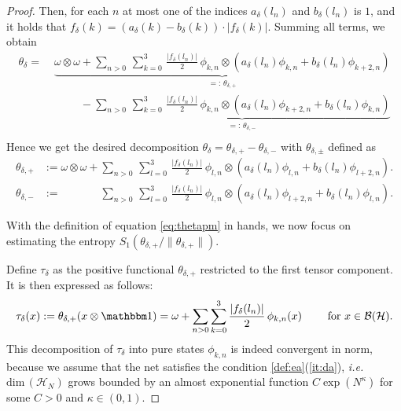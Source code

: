 \documentclass[a4paper,12pt]{article}
\theoremstyle{plain}
\theoremstyle{definition}
\theoremstyle{remark}
\def\B{{\mathcal B}}
\def\H{{\mathcal H}}
\def\dim{\mathrm{dim}\,}
\def\1{{\mathbbm 1}}
\begin{document}
\begin{proof}
Then, for each $n$ at most one of the indices $a_\delta(l_n)$ and $b_\delta(l_n)$ is $1$,
and it holds that $f_\delta(k) = (a_\delta(k) - b_\delta(k))\cdot \left|f_\delta(k)\right|$.
Summing all terms,
we obtain
\begin{align*}
  \theta_\delta =& \; \underbrace{ \omega\otimes\omega +
  \sum_{n>0}\,\sum_{k=0}^3\, \frac{| f_\delta(l_n)|}{2}\,\phi_{k,n} \otimes \left( a_\delta(l_n) \phi_{k,n} + b_{\delta}(l_n)\phi_{k+2,n} \right)}_{=: \, \theta_{\delta,+}} \\
  & \; \phantom{\omega\otimes\omega} -\underbrace{
  \sum_{n>0}\,\sum_{k=0}^3\, \frac{| f_\delta(l_n)|}{2}\, \phi_{k,n} \otimes \left( a_\delta(l_n) \phi_{k+2,n} + b_{\delta}(l_n)\phi_{k,n}
  \right)}_{=: \, \theta_{\delta,-}} \\
\end{align*}
Hence we get the desired decomposition $\theta_\delta = \theta_{\delta, +} - \theta_{\delta, -}$ with  $\theta_{\delta,\pm}$ defined as
\begin{align}\label{eq:thetapm}
  \theta_{\delta,+} &:= \omega\otimes\omega +
  \sum_{n>0}\,\sum_{l=0}^3\, \frac{|f_\delta(l_n)|}{2}\,\phi_{l,n} \otimes \left( a_\delta(l_n) \phi_{l,n} + b_{\delta}(l_n)\phi_{l+2,n} \right). \nonumber\\
  \theta_{\delta,-} &:= \phantom{\omega\otimes\omega +}
  \sum_{n>0}\,\sum_{l=0}^3\, \frac{|f_\delta(l_n)|}{2}\,\phi_{l,n} \otimes \left( a_\delta(l_n) \phi_{l+2,n} + b_{\delta}(l_n)\phi_{l,n} \right).
\end{align}


With the definition of equation \eqref{eq:thetapm} in hands, we now focus on estimating the entropy $S_1(\theta_{\delta,+}/\|\theta_{\delta,+}\|)$.

Define $\tau_\delta$ as the positive functional $\theta_{\delta,+}$ restricted to the first tensor component. It is then expressed as follows:
\begin{equation}\label{eq:taud}
  \tau_\delta(x) := \theta_{\delta,+}(x\otimes \1) = \omega +
  \sum_{n>0}\sum_{k=0}^3 \frac{|f_\delta(l_n)|}{2}\,\phi_{k,n}(x)
  \qquad \text{ for } x\in \B(\H).
\end{equation}
This decomposition of $\tau_\delta$ into pure states $\phi_{k,n}$ is
indeed convergent in norm, because we assume that the net satisfies the condition \ref{def:ea}(\ref{it:da}), \textit{i.e.}\! $\dim(\H_N)$ grows bounded by an almost exponential function $C\exp(N^\kappa)$ for some $C>0$
and $\kappa\in(0,1)$.


\end{proof}
\end{document}
